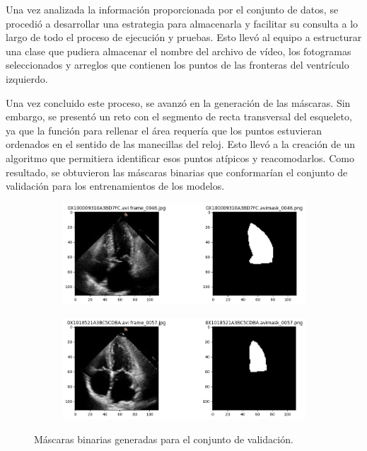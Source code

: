 \documentclass[runningheads]{llncs}
\begin{document}
Una vez analizada la información proporcionada por el conjunto de datos, se procedió a desarrollar una estrategia para almacenarla y facilitar su consulta a lo largo de todo el proceso de ejecución y pruebas. Esto llevó al equipo a estructurar una clase que pudiera almacenar el nombre del archivo de vídeo, los fotogramas seleccionados y arreglos que contienen los puntos de las fronteras del ventrículo izquierdo.

Una vez concluido este proceso, se avanzó en la generación de las máscaras. Sin embargo, se presentó un reto con el segmento de recta transversal del esqueleto, ya que la función para rellenar el área requería que los puntos estuvieran ordenados en el sentido de las manecillas del reloj. Esto llevó a la creación de un algoritmo que permitiera identificar esos puntos atípicos y reacomodarlos. Como resultado, se obtuvieron las máscaras binarias que conformarían el conjunto de validación para los entrenamientos de los modelos.

\begin{figure}
    \centering
    \begin{subfigure}{0.45\linewidth}
        \includegraphics[scale= 0.205]{images/Mask1.png}
    \end{subfigure}
    \begin{subfigure}{0.45\linewidth}
        \includegraphics[scale= 0.205]{images/Mask2.png}
    \end{subfigure}
    \caption{Máscaras binarias generadas para el conjunto de validación.}
\end{figure}
\end{document}
